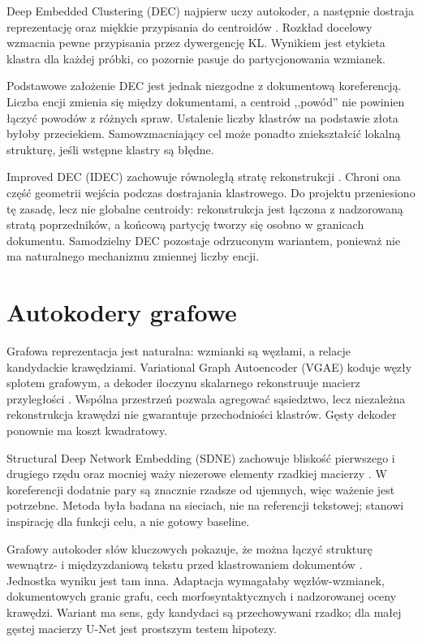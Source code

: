 Deep Embedded Clustering (DEC) najpierw uczy autokoder, a następnie dostraja reprezentację oraz miękkie przypisania do centroidów \cite{xie_2016_dec}. Rozkład docelowy wzmacnia pewne przypisania przez dywergencję KL. Wynikiem jest etykieta klastra dla każdej próbki, co pozornie pasuje do partycjonowania wzmianek.

Podstawowe założenie DEC jest jednak niezgodne z dokumentową koreferencją. Liczba encji zmienia się między dokumentami, a centroid ,,powód'' nie powinien łączyć powodów z różnych spraw. Ustalenie liczby klastrów na podstawie złota byłoby przeciekiem. Samowzmacniający cel może ponadto zniekształcić lokalną strukturę, jeśli wstępne klastry są błędne.

Improved DEC (IDEC) zachowuje równoległą stratę rekonstrukcji \cite{guo_2017_idec}. Chroni ona część geometrii wejścia podczas dostrajania klastrowego. Do projektu przeniesiono tę zasadę, lecz nie globalne centroidy: rekonstrukcja jest łączona z nadzorowaną stratą poprzedników, a końcową partycję tworzy się osobno w granicach dokumentu. Samodzielny DEC pozostaje odrzuconym wariantem, ponieważ nie ma naturalnego mechanizmu zmiennej liczby encji.

\section{Autokodery grafowe}
\label{sec:grafowe-ae}

Grafowa reprezentacja jest naturalna: wzmianki są węzłami, a relacje kandydackie krawędziami. Variational Graph Autoencoder (VGAE) koduje węzły splotem grafowym, a dekoder iloczynu skalarnego rekonstruuje macierz przyległości \cite{kipf_2016_vgae}. Wspólna przestrzeń pozwala agregować sąsiedztwo, lecz niezależna rekonstrukcja krawędzi nie gwarantuje przechodniości klastrów. Gęsty dekoder ponownie ma koszt kwadratowy.

Structural Deep Network Embedding (SDNE) zachowuje bliskość pierwszego i drugiego rzędu oraz mocniej waży niezerowe elementy rzadkiej macierzy \cite{wang_2016_sdne}. W koreferencji dodatnie pary są znacznie rzadsze od ujemnych, więc ważenie jest potrzebne. Metoda była badana na sieciach, nie na referencji tekstowej; stanowi inspirację dla funkcji celu, a nie gotowy baseline.

Grafowy autokoder słów kluczowych pokazuje, że można łączyć strukturę wewnątrz- i międzyzdaniową tekstu przed klastrowaniem dokumentów \cite{chiu_2020_keyword}. Jednostka wyniku jest tam inna. Adaptacja wymagałaby węzłów-wzmianek, dokumentowych granic grafu, cech morfosyntaktycznych i nadzorowanej oceny krawędzi. Wariant ma sens, gdy kandydaci są przechowywani rzadko; dla małej gęstej macierzy U-Net jest prostszym testem hipotezy.

